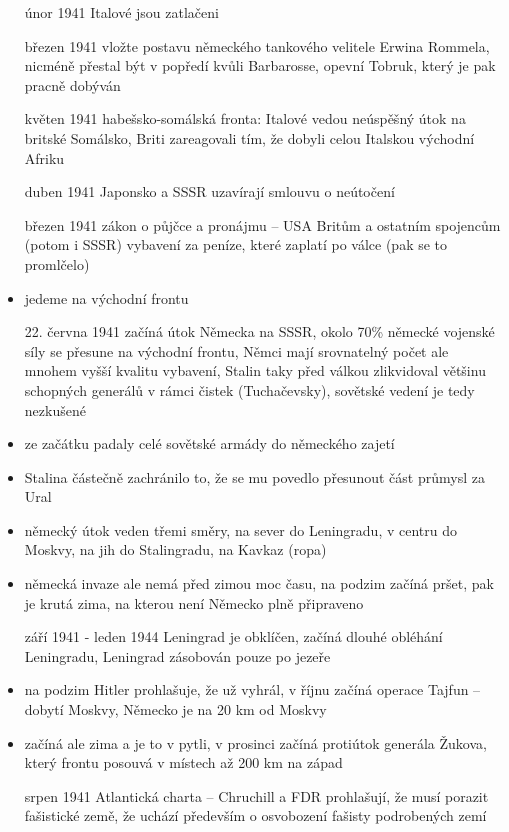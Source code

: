 \documentclass{article}
\begin{document}
\begin{itemize}
  \item[únor 1941] Italové jsou zatlačeni
  \item[březen 1941] vložte postavu německého tankového velitele Erwina Rommela, nicméně přestal být v popředí kvůli Barbarosse, opevní Tobruk, který je pak pracně dobýván
  \item[květen 1941] habešsko-somálská fronta: Italové vedou neúspěšný útok na britské Somálsko, Briti zareagovali tím, že dobyli celou Italskou východní Afriku
  \item[duben 1941] Japonsko a SSSR uzavírají smlouvu o neútočení
  \item[březen 1941] zákon o půjčce a pronájmu -- USA  Britům a ostatním spojencům (potom i SSSR) vybavení za peníze, které zaplatí po válce (pak se to promlčelo)
  \item jedeme na východní frontu
  \item[22. června 1941] začíná útok Německa na SSSR, okolo 70\% německé vojenské síly se přesune na východní frontu, Němci mají srovnatelný počet ale mnohem vyšší kvalitu vybavení, Stalin taky před válkou zlikvidoval většinu schopných generálů v rámci čistek (Tuchačevsky), sovětské vedení je tedy nezkušené
  \item ze začátku padaly celé sovětské armády do německého zajetí
  \item Stalina částečně zachránilo to, že se mu povedlo přesunout část průmysl za Ural
  \item německý útok veden třemi směry, na sever do Leningradu, v centru do Moskvy, na jih do Stalingradu, na Kavkaz (ropa)
  \item německá invaze ale nemá před zimou moc času, na podzim začíná pršet, pak je krutá zima, na kterou není Německo plně připraveno
  \item[září 1941 - leden 1944] Leningrad je obklíčen, začíná dlouhé obléhání Leningradu, Leningrad zásobován pouze po jezeře
  \item na podzim Hitler prohlašuje, že už vyhrál, v říjnu začíná operace Tajfun -- dobytí Moskvy, Německo je na 20 km od Moskvy
  \item začíná ale zima a je to v pytli, v prosinci začíná protiútok generála Žukova, který frontu posouvá v místech až 200 km na západ
  \item[srpen 1941] Atlantická charta -- Chruchill a FDR prohlašují, že musí porazit fašistické země, že uchází především o osvobození fašisty podrobených zemí
\end{itemize}
\end{document}
